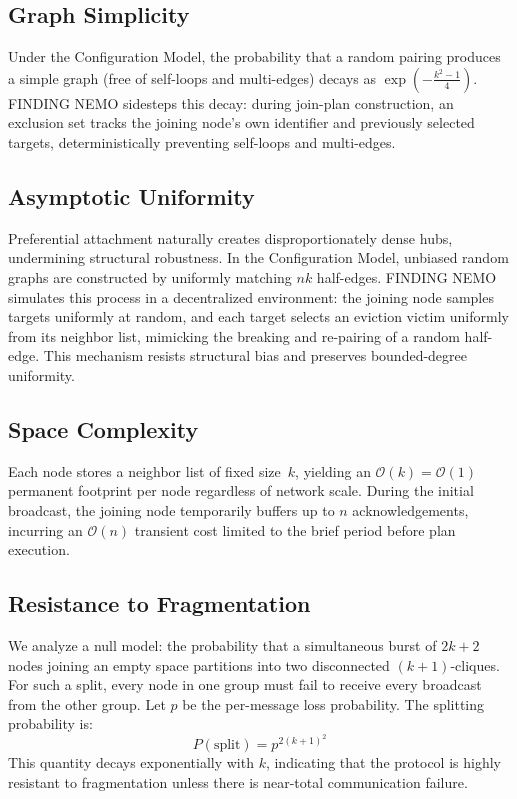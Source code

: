 \documentclass[runningheads]{llncs}
\begin{document}
\subsection{Graph Simplicity}
Under the Configuration Model, the probability that a random pairing produces a simple graph (free of self-loops and multi-edges) decays as $\exp\left(-\frac{k^2 - 1}{4}\right)$. FINDING NEMO sidesteps this decay: during join-plan construction, an exclusion set tracks the joining node's own identifier and previously selected targets, deterministically preventing self-loops and multi-edges.

\subsection{Asymptotic Uniformity}
Preferential attachment naturally creates disproportionately dense hubs, undermining structural robustness. In the Configuration Model, unbiased random graphs are constructed by uniformly matching $nk$ half-edges. FINDING NEMO simulates this process in a decentralized environment: the joining node samples targets uniformly at random, and each target selects an eviction victim uniformly from its neighbor list, mimicking the breaking and re-pairing of a random half-edge. This mechanism resists structural bias and preserves bounded-degree uniformity.

\subsection{Space Complexity}
Each node stores a neighbor list of fixed size~$k$, yielding an $\mathcal{O}(k) = \mathcal{O}(1)$ permanent footprint per node regardless of network scale. During the initial broadcast, the joining node temporarily buffers up to $n$ acknowledgements, incurring an $\mathcal{O}(n)$ transient cost limited to the brief period before plan execution.

\subsection{Resistance to Fragmentation}
We analyze a null model: the probability that a simultaneous burst of $2k+2$ nodes joining an empty space partitions into two disconnected $(k+1)$-cliques. For such a split, every node in one group must fail to receive every broadcast from the other group. Let $p$ be the per-message loss probability. The splitting probability is:
$$P(\text{split}) = p^{2(k+1)^2}$$
This quantity decays exponentially with $k$, indicating that the protocol is highly resistant to fragmentation unless there is near-total communication failure.
\end{document}
